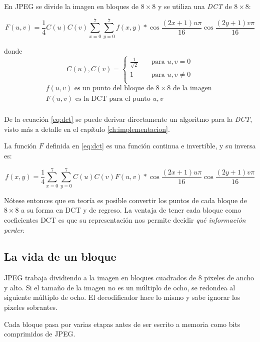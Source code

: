En JPEG se divide la imagen en bloques de $8\times8$ y se utiliza una
\emph{DCT} de $8\times8$:

\begin{equation}\label{eq:dct}
F(u, v) = \frac{1}{4} C(u)C(v) \sum_{x=0}^{7}\sum_{y=0}^{7}
f(x,y)*\cos{\frac{(2x+1)u\pi}{16}}\cos{\frac{(2y+1)v\pi}{16}}
\end{equation}

donde \[C(u), C(v) = \begin{cases}
        \frac{1}{\sqrt{2}} & \quad \text{para } u,v = 0\\
        1                  & \quad \text{para } u,v \neq 0\\
\end{cases} \]
\begin{eqnarray*}
    f(u, v) \text{ es un punto del bloque de } 8\times8 \text{ de la imagen }\\
    F(u, v) \text{ es la DCT para el punto } u,v\\
\end{eqnarray*}

De la ecuación \ref{eq:dct} se puede derivar directamente un algoritmo para la
\emph{DCT}, visto más a detalle en el capítulo \ref{ch:implementacion}.

La función $F$ definida en \ref{eq:dct} es una función continua e invertible, y
su inversa es:

\begin{equation}\label{eq:idct}
f(x, y) = \frac{1}{4} \sum_{x=0}^{7}\sum_{y=0}^{7} C(u)C(v) F(u, v)*
\cos{\frac{(2x+1)u\pi}{16}}\cos{\frac{(2y+1)v\pi}{16}}
\end{equation}

Nótese entonces que en teoría es posible convertir los puntos de cada bloque de
$8\times8$ a su forma en DCT y de regreso. La ventaja de tener cada bloque como
coeficientes DCT es que su representación nos permite decidir \emph{qué
información perder}.

\subsection{La vida de un bloque}\label{sub:vida}


JPEG trabaja dividiendo a la imagen en bloques cuadrados de 8 pixeles de ancho
y alto. Si el tamaño de la imagen no es un múltiplo de ocho, se redondea al
siguiente múltiplo de ocho. El decodificador hace lo mismo y sabe ignorar los
pixeles sobrantes.

Cada bloque pasa por varias etapas antes de ser escrito a memoria como bits
comprimidos de JPEG.


